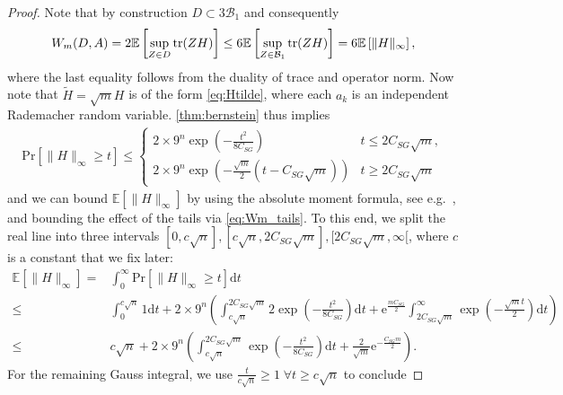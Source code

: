 \begin{proof}
Note that by construction $D \subset 3 \mathcal{B}_1$ and consequently
\begin{align}
  W_m (D,  A) = 2 \mathbb{E} \left[ \sup_{ Z \in D} \operatorname{tr} ( Z  H) \right] \leq 6 \mathbb{E} \left[ \sup_{ Z \in \mathcal{B}_1} \operatorname{tr} ( Z  H) \right] = 6 \mathbb{E} \left[ \|  H \|_\infty  \right], \label{eq:Wm_hoelder}
\end{align}
where the last equality follows from the duality of trace and operator norm. Now note that $\tilde{ H} = \sqrt{m}  H$ is of the form \eqref{eq:Htilde}, where each $a_k$ is an independent Rademacher random variable.
\cref{thm:bernstein} thus implies
\begin{align}
  \mathrm{Pr} \left[\|  H \|_\infty \geq t \right]
  \leq
  \begin{cases}
   2 \times 9^n \exp \left( - \frac{t^2}{8 C_{SG}} \right) & t \leq 2C_{SG} \sqrt{m}, \\
  2 \times 9^n \exp \left( - \frac{\sqrt{m}}{2} \left( t - C_{SG} \sqrt{m} \right) \right) & t \geq 2 C_{SG} \sqrt{m}
  \end{cases}
  \label{eq:Wm_tails}
\end{align}
and we can bound $\mathbb{E} \left[ \|  H \|_\infty \right]$ by using the absolute moment formula,
see e.g.\ \cite[Propostion~7.1]{Foucart_2013_Mathematical}, and bounding the effect of the tails via \eqref{eq:Wm_tails}.
To this end, we split the real line into three intervals $[0, c \sqrt{n}], [c\sqrt{n}, 2 C_{SG} \sqrt{m}], [2 C_{SG} \sqrt{m},\infty[$, where $c$ is a constant that we fix later:
\begin{align*}
  \mathbb{E} \left[ \| H\|_\infty \right] =& \int_0^\infty \mathrm{Pr} \left[ \| H\|_\infty \geq t \right] \mathrm{d}t \\
  \leq & \int_0^{c \sqrt{n}} 1 \mathrm{d}t + 2 \times 9^n \left( \int_{c \sqrt{n}}^{2 C_{SG} \sqrt{m}} 2 \exp \left( - \frac{t^2}{8 C_{SG}} \right) \mathrm{d}t
  +  \mathrm{e}^{\frac{m C_{SG}}{2}} \int_{2 C_{SG} \sqrt{m}}^\infty \exp\left( - \frac{\sqrt{m}t}{2}  \right) \mathrm{d} t \right)\\
  \leq & c \sqrt{n} + 2 \times 9^n \left( \int_{c \sqrt{n}}^{2 C_{SG} \sqrt{m}}  \exp \left( - \frac{t^2}{8 C_{SG}} \right) \mathrm{d}t
  + \frac{2}{\sqrt{m}} \mathrm{e}^{-\frac{C_{SG} m}{2}}\right).
\end{align*}
For the remaining Gauss integral, we use $\frac{t}{c \sqrt{n}} \geq 1\; \forall t \geq c\sqrt{n}$ to conclude

\end{proof}
